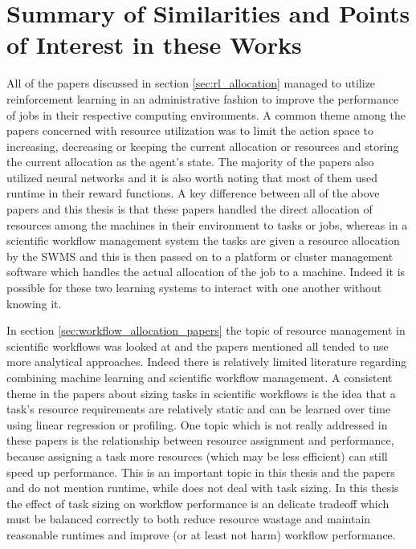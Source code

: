 \section{Summary of Similarities and Points of Interest in these Works}
\label{sec:takeaways}

All of the papers discussed in section \ref{sec:rl_allocation} managed to utilize reinforcement learning in an administrative fashion to improve the performance of jobs in their respective computing environments. A common theme among the papers concerned with resource utilization was to limit the action space to increasing, decreasing or keeping the current allocation or resources and storing the current allocation as the agent’s state. The majority of the papers also utilized neural networks and it is also worth noting that most of them used runtime in their reward functions. A key difference between all of the above papers and this thesis is that these papers handled the direct allocation of resources among the machines in their environment to tasks or jobs, whereas in a scientific workflow management system the tasks are given a resource allocation by the SWMS and this is then passed on to a platform or cluster management software which handles the actual allocation of the job to a machine. Indeed it is possible for these two learning systems to interact with one another without knowing it.

In section \ref{sec:workflow_allocation_papers} the topic of resource management in scientific workflows was looked at and the papers mentioned all tended to use more analytical approaches. Indeed there is relatively limited literature regarding combining machine learning and scientific workflow management. A consistent theme in the papers about sizing tasks in scientific workflows is the idea that a task’s resource requirements are relatively static and can be learned over time using linear regression or profiling.  One topic which is not really addressed in these papers is the relationship between resource assignment and performance, because assigning a task more resources (which may be less efficient) can still speed up performance. This is an important topic in this thesis and the papers \cite{FeedbackBasedAllocation} and \cite{tovarjob} do not mention runtime, while \cite{tarema} does not deal with task sizing. In this thesis the effect of task sizing on workflow performance is an delicate tradeoff which must be balanced correctly to both reduce resource wastage and maintain reasonable runtimes and improve (or at least not harm) workflow performance.

